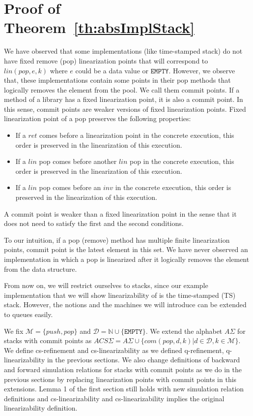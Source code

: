 \section{Proof of Theorem~\ref{th:absImplStack}}\label{app:absImplStack}

We have observed that some implementations (like time-stamped stack) do not have fixed remove (pop) linearization points that will correspond to $lin(pop,e,k)$ where $e$ could be a data value or $\texttt{EMPTY}$. However, we observe that, these implementations contain some points in their pop methods that logically removes the element from the pool. We call them commit points. If a method of a library has a fixed linearization  point, it is also a commit point. In this sense, commit points are weaker versions of fixed linearization points. Fixed linearization point of a pop preserves the following properties:
\begin{itemize}
\item If a $ret$ comes before a linearization point in the concrete execution, this order is preserved in the linearization of this execution.
\item If a $lin$ pop comes before another $lin$ pop in the concrete execution, this order is preserved in the linearization of this execution.
\item If a $lin$ pop comes before an $inv$ in the concrete execution, this order is preserved in the linearization of this execution. 
\end{itemize} 
A commit point is weaker than a fixed linearization point in the sense that it does not need to satisfy the first and the second conditions. 

To our intuition, if a pop (remove) method has multiple finite linearization points, commit point is the latest element in this set. We have never observed an implementation in which a pop is linearized after it logically removes the element from the data structure. 

From now on, we will restrict ourselves to stacks, since our example implementation that we will show linearizability of is the time-stamped (TS) stack. However, the notions and the machines we will introduce can be extended to queues easily. 

We fix $\mathcal{M} = \{push, pop\}$ and $\mathcal{D} = \mathbb{N} \cup \{\texttt{EMPTY}\}$. We extend the alphabet $A\Sigma$ for stacks with commit points as $ACS\Sigma = A\Sigma \cup \{com(pop,d,k)|d \in \mathcal{D}, k \in \mathcal{M}\}$. We define cs-refinement and cs-linearizability as we defined q-refinement, q-linearizability in the previous sections. We also change definitions of backward and forward simulation relations for stacks with commit points as we do in the previous sections by replacing linearization points with commit points in this extensions. Lemma 1 of the first section still holds with new simulation relation definitions and cs-linearizability and cs-linearizability implies the original linearizability definition. 

